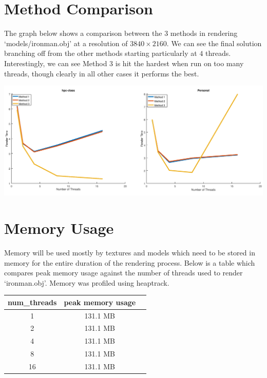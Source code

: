 \documentclass[12pt]{article}
\begin{document}
\section*{Method Comparison}

The graph below shows a comparison between the 3 methods in rendering `models/ironman.obj' 
at a resolution of $3840\times2160$. We can see
the final solution branching off from the other methods starting particularly at $4$ threads.
Interestingly, we can see Method 3 is hit the hardest when run on too many threads, though clearly
in all other cases it performs the best.

\begin{center}
	\includegraphics[width=\textwidth]{method_comp.png}
\end{center}

\section*{Memory Usage}

Memory will be used mostly by textures and models which need to be stored in memory
for the entire duration of the rendering process. Below is a table which compares peak
memory usage against the number of threads used to render `ironman.obj'. Memory was profiled using
heaptrack.

\begin{center}
	\begin{tabular}{|c|c|c|}
		\hline
		num\_threads & peak memory usage \\ \hline
		1	& 131.1 MB \\ \hline
		2	& 131.1 MB \\ \hline
		4	& 131.1 MB \\ \hline
		8	& 131.1 MB \\ \hline
		16	& 131.1 MB \\ \hline
	\end{tabular}
\end{center}
\end{document}
